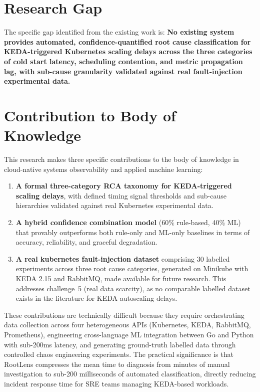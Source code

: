 \section{Research Gap}
The specific gap identified from the existing work is: \textbf{No existing system provides automated, confidence-quantified root cause classification for KEDA-triggered Kubernetes scaling delays across the three categories of cold start latency, scheduling contention, and metric propagation lag, with sub-cause granularity validated against real fault-injection experimental data.}

\section{Contribution to Body of Knowledge}
This research makes three specific contributions to the body of knowledge in cloud-native systems observability and applied machine learning:

\begin{enumerate}
    \item \textbf{A formal three-category RCA taxonomy for KEDA-triggered scaling delays}, with defined timing signal thresholds and sub-cause hierarchies validated against real Kubernetes experimental data.
    \item \textbf{A hybrid confidence combination model} (60\% rule-based, 40\% ML) that provably outperforms both rule-only and ML-only baselines in terms of accuracy, reliability, and graceful degradation.
    \item \textbf{A real kubernetes fault-injection dataset} comprising 30 labelled experiments across three root cause categories, generated on Minikube with KEDA 2.15 and RabbitMQ, made available for future research. This addresses challenge~5 (real data scarcity), as no comparable labelled dataset exists in the literature for KEDA autoscaling delays.
\end{enumerate}

These contributions are technically difficult because they require orchestrating data collection across four heterogeneous APIs (Kubernetes, KEDA, RabbitMQ, Prometheus), engineering cross-language ML integration between Go and Python with sub-200ms latency, and generating ground-truth labelled data through controlled chaos engineering experiments. The practical significance is that RootLens compresses the mean time to diagnosis from minutes of manual investigation to sub-200 milliseconds of automated classification, directly reducing incident response time for SRE teams managing KEDA-based workloads.


